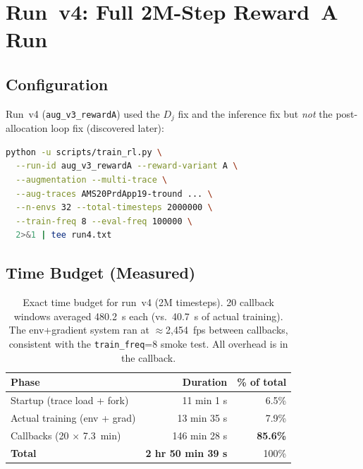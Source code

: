 \documentclass[11pt]{article}
\begin{document}
\section{Run~v4: Full 2M-Step Reward~A Run}
\label{sec:run4}

\subsection{Configuration}

Run~v4 (\texttt{aug\_v3\_rewardA}) used the $D_j$ fix and the inference fix
but \textit{not} the post-allocation loop fix (discovered later):

\begin{lstlisting}[language=bash]
python -u scripts/train_rl.py \
  --run-id aug_v3_rewardA --reward-variant A \
  --augmentation --multi-trace \
  --aug-traces AMS20PrdApp19-tround ... \
  --n-envs 32 --total-timesteps 2000000 \
  --train-freq 8 --eval-freq 100000 \
  2>&1 | tee run4.txt
\end{lstlisting}

\subsection{Time Budget (Measured)}

\begin{table}[h]
\centering
\begin{tabular}{lrr}
\toprule
Phase & Duration & \% of total \\
\midrule
Startup (trace load + fork)        & 11 min 1 s  & 6.5\% \\
Actual training (env + grad)       & 13 min 35 s & 7.9\% \\
Callbacks (20 $\times$ 7.3~min)    & 146 min 28 s & \textbf{85.6\%} \\
\midrule
\textbf{Total}                     & \textbf{2 hr 50 min 39 s} & 100\% \\
\bottomrule
\end{tabular}
\caption{Exact time budget for run~v4 (2M timesteps).
20 callback windows averaged 480.2~s each (vs.\ 40.7~s of actual training).
The env+gradient system ran at $\approx$2,454~fps between callbacks,
consistent with the \texttt{train\_freq}=8 smoke test.
All overhead is in the callback.}
\end{table}
\end{document}
